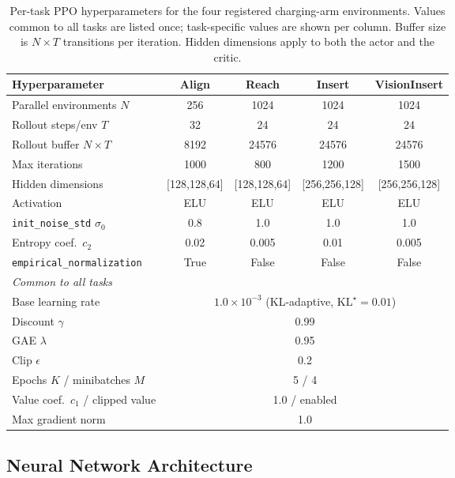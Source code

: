 \begin{table}[!ht]
\centering
\caption{Per-task PPO hyperparameters for the four registered charging-arm environments. Values common to all tasks are listed once; task-specific values are shown per column. Buffer size is $N\times T$ transitions per iteration. Hidden dimensions apply to both the actor and the critic.}
\label{rl:tab:rl-hyper}
\small
\begin{tabular}{lcccc}
\toprule
Hyperparameter & Align & Reach & Insert & VisionInsert \\
\midrule
Parallel environments $N$ & 256 & 1024 & 1024 & 1024 \\
Rollout steps/env $T$ & 32 & 24 & 24 & 24 \\
Rollout buffer $N\times T$ & \num{8192} & \num{24576} & \num{24576} & \num{24576} \\
Max iterations & 1000 & 800 & 1200 & 1500 \\
Hidden dimensions & [128,128,64] & [128,128,64] & [256,256,128] & [256,256,128] \\
Activation & ELU & ELU & ELU & ELU \\
\texttt{init\_noise\_std} $\sigma_0$ & 0.8 & 1.0 & 1.0 & 1.0 \\
Entropy coef.\ $c_2$ & 0.02 & 0.005 & 0.01 & 0.005 \\
\texttt{empirical\_normalization} & True & False & False & False \\
\midrule
\multicolumn{5}{l}{\emph{Common to all tasks}} \\
Base learning rate & \multicolumn{4}{c}{$1.0\times10^{-3}$ (KL-adaptive, $\text{KL}^\star=0.01$)} \\
Discount $\gamma$ & \multicolumn{4}{c}{0.99} \\
GAE $\lambda$ & \multicolumn{4}{c}{0.95} \\
Clip $\epsilon$ & \multicolumn{4}{c}{0.2} \\
Epochs $K$ / minibatches $M$ & \multicolumn{4}{c}{5 / 4} \\
Value coef.\ $c_1$ / clipped value & \multicolumn{4}{c}{1.0 / enabled} \\
Max gradient norm & \multicolumn{4}{c}{1.0} \\
\bottomrule
\end{tabular}
\end{table}

\rlFloatBarrier

\subsection{Neural Network Architecture}\label{rl:sec:rl-net}

